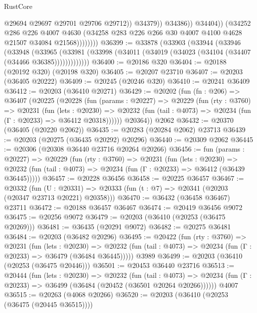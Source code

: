 \begin{lexlean}{RustCore}
\begin{coremodule}
                                @29694
                                @29697
                                @29701
                                @29706
                                @29712))
                            @34379))
                        @34386))
                    @34404))
                (@34252
                  @286
                  @226
                  @4007
                  @4630
                  (@34258 @283 @226 @266 @30 @4007 @4100 @4628 @21507 @34084 @21568))))))))
@36399 := @33878
    (@33903
      (@33944
        (@33946
          (@33948
            (@33965
              (@33981 (@33998 (@34011 (@34019 (@34023 (@34104 (@34407 (@34466 @36385)))))))))))))
@36400 := @20186 @320
@36404 := @20188 (@20192 @320) (@20198 @320)
@36405 := @20207 @23710
@36407 := @20203 (@36405 @20222)
@36409 := @20245 (@20246 @320)
@36410 := @20241 @36409
@36412 := @20203 (@36410 @20271)
@36429 := @20202
    (fun (fn : @206) =>
    @36407
      (@20225
        (@20228
          (fun (params : @20227) =>
          @20229
            (fun (rty : @3760) =>
            @20231
              (fun (lets : @20230) =>
              @20232 (fun (tail : @4073) => @20234 (fun (Γ : @20233) => @36412 @20318))))))
        @20364))
    @2062
@36432 := @20370 (@36405 (@20220 @2062))
@36435 := @20283 (@20284 @2062) @23713
@36439 := @20203 (@20275 (@36435 @20292) @20296)
@36440 := @20309 @2062
@36445 := @20306 (@20308 @36440 @23716 @20264 @20266)
@36456 := fun (params : @20227) =>
  @20229
    (fun (rty : @3760) =>
    @20231
      (fun (lets : @20230) =>
      @20232 (fun (tail : @4073) => @20234 (fun (Γ : @20233) => @36412 (@36439 @36445)))))
@36457 := @20228 @36456
@36458 := @20225 @36457
@36467 := @20332
    (fun (U : @20331) => @20333 (fun (t : @7) => @20341 (@20203 (@20347 @23713 @20221) @20358)))
@36470 := @36432 (@36458 @36467) @23711
@36472 := @20188 @36457 @36467
@36474 := @20419 @36456 @9072
@36475 := @20256 @9072
@36479 := @20203 (@36410 (@20253 (@36475 @20269)))
@36481 := @36435 (@20291 @9072)
@36482 := @20275 @36481
@36484 := @20203 (@36482 @20296)
@36495 := @20422
    (fun (rty : @3760) =>
    @20231
      (fun (lets : @20230) =>
      @20232 (fun (tail : @4073) => @20234 (fun (Γ : @20233) => @36479 (@36484 @36445)))))
    @3989
@36499 := @20203 (@36410 (@20253 (@36475 @20446)))
@36501 := @20453 @36440 @23716
@36513 := @20444
    (fun (lets : @20230) =>
    @20232
      (fun (tail : @4073) =>
      @20234 (fun (Γ : @20233) => @36499 (@36484 (@20452 (@36501 @20264 @20266))))))
    @4007
@36515 := @20263 (@4068 @20266)
@36520 := @20203 (@36410 (@20253 (@36475 (@20445 @36515))))

\end{coremodule}
\end{lexlean}
